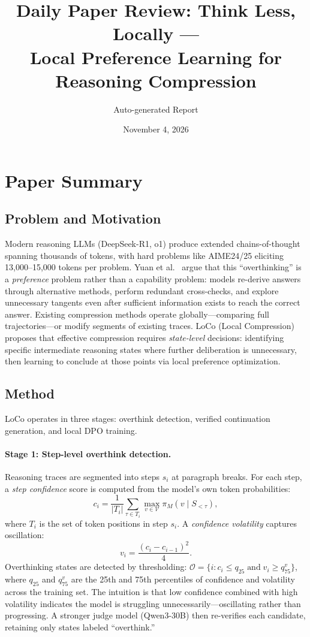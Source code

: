 \documentclass[11pt,a4paper]{article}
\title{Daily Paper Review: Think Less, Locally ---\\Local Preference Learning for Reasoning Compression}
\author{Auto-generated Report}
\date{November 4, 2026}
\begin{document}
\maketitle

\section{Paper Summary}

\subsection{Problem and Motivation}
Modern reasoning LLMs (DeepSeek-R1, o1) produce extended chains-of-thought spanning thousands of tokens, with hard problems like AIME24/25 eliciting 13{,}000--15{,}000 tokens per problem. Yuan et al.~\cite{yuan2026loco} argue that this ``overthinking'' is a \emph{preference} problem rather than a capability problem: models re-derive answers through alternative methods, perform redundant cross-checks, and explore unnecessary tangents even after sufficient information exists to reach the correct answer. Existing compression methods operate globally---comparing full trajectories---or modify segments of existing traces. LoCo (Local Compression) proposes that effective compression requires \emph{state-level} decisions: identifying specific intermediate reasoning states where further deliberation is unnecessary, then learning to conclude at those points via local preference optimization.

\subsection{Method}
LoCo operates in three stages: overthink detection, verified continuation generation, and local DPO training.

\paragraph{Stage 1: Step-level overthink detection.}
Reasoning traces are segmented into steps $s_i$ at paragraph breaks. For each step, a \emph{step confidence} score is computed from the model's own token probabilities:
\begin{equation}
  c_i = \frac{1}{|T_i|}\sum_{\tau \in T_i} \max_{v \in \mathcal{V}} \pi_M(v \mid S_{<\tau}),
\end{equation}
where $T_i$ is the set of token positions in step $s_i$. A \emph{confidence volatility} captures oscillation:
\begin{equation}
  v_i = \frac{(c_i - c_{i-1})^2}{4}.
\end{equation}
Overthinking states are detected by thresholding: $\mathcal{O} = \{i : c_i \leq q_{25} \;\text{and}\; v_i \geq q_{75}^v\}$, where $q_{25}$ and $q_{75}^v$ are the 25th and 75th percentiles of confidence and volatility across the training set. The intuition is that low confidence combined with high volatility indicates the model is struggling unnecessarily---oscillating rather than progressing. A stronger judge model (Qwen3-30B) then re-verifies each candidate, retaining only states labeled ``overthink.''
\end{document}
